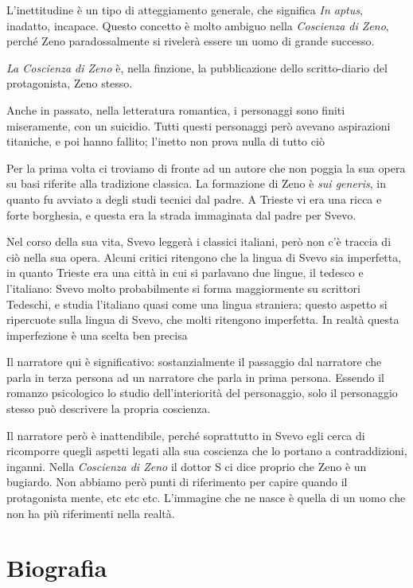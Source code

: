 L'inettitudine è un tipo di atteggiamento generale, che significa \textit{In aptus}, inadatto, incapace.
Questo concetto è molto ambiguo nella \textit{Coscienza di Zeno}, perché Zeno paradossalmente si rivelerà essere un uomo di grande successo.

\textit{La Coscienza di Zeno} è, nella finzione, la pubblicazione dello scritto-diario del protagonista, Zeno stesso.

Anche in passato, nella letteratura romantica, i personaggi sono finiti miseramente, con un suicidio. Tutti questi personaggi però avevano aspirazioni titaniche, e poi hanno fallito; l'inetto non prova nulla di tutto ciò

Per la prima volta ci troviamo di fronte ad un autore che non poggia la sua opera su basi riferite alla tradizione classica. La formazione di Zeno è \textit{sui generis}, in quanto fu avviato a degli studi tecnici dal padre.
A Trieste vi era una ricca e forte borghesia, e questa era la strada immaginata dal padre per Svevo.

Nel corso della sua vita, Svevo leggerà i classici italiani, però non c'è traccia di ciò nella sua opera. Alcuni critici ritengono che la lingua di Svevo sia imperfetta, in quanto Trieste era una città in cui si parlavano due lingue, il tedesco e l'italiano: Svevo molto probabilmente si forma maggiormente su scrittori Tedeschi, e studia l'italiano quasi come una lingua straniera; questo aspetto si ripercuote sulla lingua di Svevo, che molti ritengono imperfetta.
In realtà questa imperfezione è una scelta ben precisa

Il narratore qui è significativo: sostanzialmente il passaggio dal narratore che parla in terza persona ad un narratore che parla in prima persona. Essendo il romanzo psicologico lo studio dell'interiorità del personaggio, solo il personaggio stesso può descrivere la propria coscienza.

Il narratore però è inattendibile, perché soprattutto in Svevo egli cerca di ricomporre quegli aspetti legati alla sua coscienza che lo portano a contraddizioni, inganni. Nella \textit{Coscienza di Zeno} il dottor S ci dice proprio che Zeno è un bugiardo. Non abbiamo però punti di riferimento per capire quando il protagonista mente, etc etc etc. L'immagine che ne nasce è quella di un uomo che non ha più riferimenti nella realtà.

\section{Biografia}

